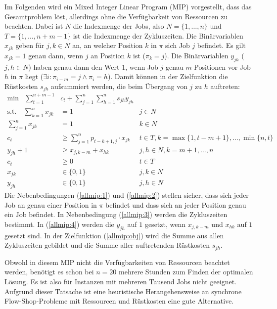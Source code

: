 \documentclass{scrreprt}
\begin{document}
Im Folgenden wird ein Mixed Integer Linear Program (MIP) vorgestellt, dass das Gesamtproblem löst, allerdings ohne die Verfügbarkeit von Ressourcen zu beachten.
Dabei ist $N$ die Indexmenge der Jobs, also $N=\{1,\ldots,n\}$ und $T=\{1,\ldots,n+m-1\}$ ist die Indexmenge der Zykluszeiten.
Die Binärvariablen $x_{jk}$ geben für $j,k\in N$ an, an welcher Position $k$ in $\pi$
sich Job $j$ befindet. Es gilt $x_{jk}=1$ genau dann, wenn $j$ an Position $k$ ist ($\pi_k=j$). 
Die Binärvariablen $y_{jh}$ ($j,h\in N$) haben genau dann den Wert $1$, wenn Job $j$ genau $m$ Positionen vor Job $h$ in $\pi$ liegt ($\exists i:\pi_{i-m}=j \land \pi_i=h$).
Damit können in der Zielfunktion die Rüstkosten $s_{jh}$ aufsummiert werden, die beim Übergang von $j$ zu $h$ auftreten:
\begin{align}
    \text{min} \quad \sum_{t=1}^{n+m-1} &c_t + \sum_{j=1}^n \sum_{h=1}^n s_{jh} y_{jh} \label{allmip:obj}\\
    \text{s.t.}\quad \sum_{k=1}^n x_{jk} &= 1 & j\in N \label{allmip:1}\\
                     \sum_{j=1}^n x_{jk} &= 1 & k\in N \label{allmip:2}\\
    c_t &\geq \sum_{j=1}^n p_{t-k+1,j} \cdot x_{jk} & t\in T, k=\max\{1,t-m+1\},\ldots,\min\{n,t\} \label{allmip:3}\\
    y_{jh} + 1 &\geq x_{j,k-m} + x_{hk} & j,h\in N, k=m+1,\ldots,n \label{allmip:4}\\
    c_t &\geq 0 & t\in T \\
    x_{jk} &\in \{0,1\} & j,k\in N \\
    y_{jh} &\in \{0,1\} & j,h\in N
\end{align}
Die Nebenbedingungen (\ref{allmip:1}) und (\ref{allmip:2})
stellen sicher, dass sich jeder Job an genau einer Position in $\pi$ befindet und 
dass sich an jeder Position genau ein Job befindet.
In Nebenbedingung (\ref{allmip:3}) werden die Zykluszeiten bestimmt.
In (\ref{allmip:4}) werden die $y_{jh}$ auf $1$ gesetzt, wenn $x_{j,k-m}$ und $x_{hk}$ auf $1$ gesetzt sind.
In der Zielfunktion (\ref{allmip:obj}) wird die Summe aus allen
Zykluszeiten gebildet und die Summe aller auftretenden Rüstkosten $s_{jh}$.

Obwohl in diesem MIP nicht die Verfügbarkeiten von Ressourcen beachtet werden,
benötigt es schon bei $n=20$ mehrere Stunden zum Finden der optimalen Lösung.
Es ist also für Instanzen mit mehreren Tausend Jobs nicht geeignet.
Aufgrund dieser Tatsache ist eine heuristische Herangehensweise an 
synchrone Flow-Shop-Probleme mit Ressourcen und Rüstkosten eine gute Alternative.
\end{document}
